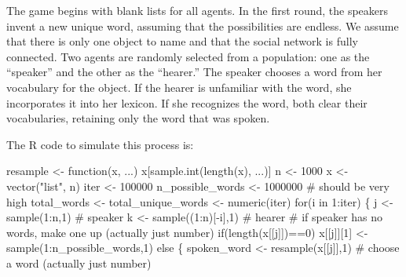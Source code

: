 \documentclass[
  a4paper,
  DIV=11,
  numbers=noendperiod,
  oneside]{scrreprt}
\newenvironment{Shaded}{\begin{snugshade}}{\end{snugshade}}
\newcommand{\CommentTok}[1]{\textcolor[rgb]{0.37,0.37,0.37}{#1}}
\newcommand{\ControlFlowTok}[1]{\textcolor[rgb]{0.00,0.23,0.31}{#1}}
\newcommand{\DecValTok}[1]{\textcolor[rgb]{0.68,0.00,0.00}{#1}}
\newcommand{\FunctionTok}[1]{\textcolor[rgb]{0.28,0.35,0.67}{#1}}
\newcommand{\NormalTok}[1]{\textcolor[rgb]{0.00,0.23,0.31}{#1}}
\newcommand{\OtherTok}[1]{\textcolor[rgb]{0.00,0.23,0.31}{#1}}
\newcommand{\SpecialCharTok}[1]{\textcolor[rgb]{0.37,0.37,0.37}{#1}}
\newcommand{\StringTok}[1]{\textcolor[rgb]{0.13,0.47,0.30}{#1}}
\begin{document}
The game begins with blank lists for all agents. In the first round, the
speakers invent a new unique word, assuming that the possibilities are
endless. We assume that there is only one object to name and that the
social network is fully connected. Two agents are randomly selected from
a population: one as the ``speaker'' and the other as the ``hearer.''
The speaker chooses a word from her vocabulary for the object. If the
hearer is unfamiliar with the word, she incorporates it into her
lexicon. If she recognizes the word, both clear their vocabularies,
retaining only the word that was spoken.

The R code to simulate this process is:

\begin{Shaded}
\begin{Highlighting}[]
\NormalTok{resample }\OtherTok{\textless{}{-}} \ControlFlowTok{function}\NormalTok{(x, ...) x[}\FunctionTok{sample.int}\NormalTok{(}\FunctionTok{length}\NormalTok{(x), ...)]}
\NormalTok{n }\OtherTok{\textless{}{-}} \DecValTok{1000}
\NormalTok{x }\OtherTok{\textless{}{-}} \FunctionTok{vector}\NormalTok{(}\StringTok{"list"}\NormalTok{, n)}
\NormalTok{iter }\OtherTok{\textless{}{-}} \DecValTok{100000}
\NormalTok{n\_possible\_words }\OtherTok{\textless{}{-}} \DecValTok{1000000} \CommentTok{\# should be very high}
\NormalTok{total\_words }\OtherTok{\textless{}{-}}\NormalTok{ total\_unique\_words  }\OtherTok{\textless{}{-}}  \FunctionTok{numeric}\NormalTok{(iter)}
\ControlFlowTok{for}\NormalTok{(i }\ControlFlowTok{in} \DecValTok{1}\SpecialCharTok{:}\NormalTok{iter)}
\NormalTok{\{}
\NormalTok{  j }\OtherTok{\textless{}{-}} \FunctionTok{sample}\NormalTok{(}\DecValTok{1}\SpecialCharTok{:}\NormalTok{n,}\DecValTok{1}\NormalTok{) }\CommentTok{\# speaker}
\NormalTok{  k }\OtherTok{\textless{}{-}} \FunctionTok{sample}\NormalTok{((}\DecValTok{1}\SpecialCharTok{:}\NormalTok{n)[}\SpecialCharTok{{-}}\NormalTok{i],}\DecValTok{1}\NormalTok{) }\CommentTok{\# hearer}
  \CommentTok{\# if speaker has no words, make one up (actually just number)}
  \ControlFlowTok{if}\NormalTok{(}\FunctionTok{length}\NormalTok{(x[[j]])}\SpecialCharTok{==}\DecValTok{0}\NormalTok{) x[[j]][}\DecValTok{1}\NormalTok{] }\OtherTok{\textless{}{-}} \FunctionTok{sample}\NormalTok{(}\DecValTok{1}\SpecialCharTok{:}\NormalTok{n\_possible\_words,}\DecValTok{1}\NormalTok{) }\ControlFlowTok{else} 
\NormalTok{  \{}
\NormalTok{    spoken\_word }\OtherTok{\textless{}{-}} \FunctionTok{resample}\NormalTok{(x[[j]],}\DecValTok{1}\NormalTok{) }\CommentTok{\# choose a word (actually just number)}

\end{Highlighting}
\end{Shaded}
\end{document}
